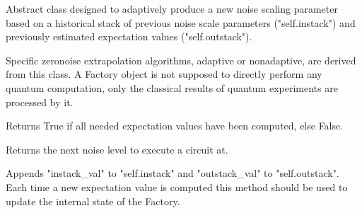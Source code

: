 \documentclass[letterpaper,10pt,english]{sphinxmanual}
\begin{document}
\begin{fulllineitems}
\label{\detokenize{index:mitiq.factories.Factory}}
Abstract class designed to adaptively produce a new noise scaling parameter
based on a historical stack of previous noise scale parameters ("self.instack")
and previously estimated expectation values ("self.outstack").

Specific zero\sphinxhyphen{}noise extrapolation algorithms, adaptive or non\sphinxhyphen{}adaptive,
are derived from this class.
A Factory object is not supposed to directly perform any quantum computation,
only the classical results of quantum experiments are processed by it.

\begin{fulllineitems}
\label{\detokenize{index:mitiq.factories.Factory.is_converged}}
Returns True if all needed expectation values have been computed, else False.

\end{fulllineitems}


\begin{fulllineitems}
\label{\detokenize{index:mitiq.factories.Factory.next}}
Returns the next noise level to execute a circuit at.

\end{fulllineitems}


\begin{fulllineitems}
\label{\detokenize{index:mitiq.factories.Factory.push}}
Appends "instack\_val" to "self.instack" and "outstack\_val" to "self.outstack".
Each time a new expectation value is computed this method should be used
to update the internal state of the Factory.


\end{fulllineitems}
\end{fulllineitems}
\end{document}
